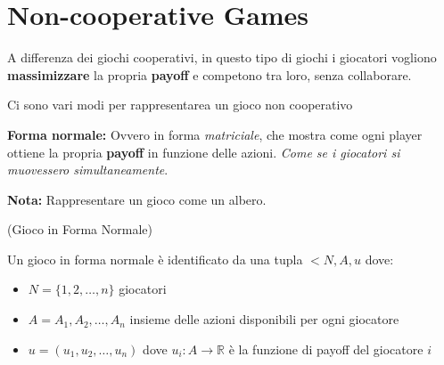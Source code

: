 \section{Non-cooperative Games}
A differenza dei giochi cooperativi, in questo tipo di giochi i giocatori
vogliono \textbf{massimizzare} la propria \textbf{payoff} e competono tra loro,
senza collaborare.

Ci sono vari modi per rappresentarea un gioco non cooperativo

\textbf{Forma normale:} Ovvero in forma \textit{matriciale}, che mostra come ogni player ottiene la propria \textbf{payoff} in funzione delle azioni. \textit{Come se i giocatori si muovessero simultaneamente}.

\textbf{Nota:} Rappresentare un gioco come un albero.

\begin{figure}[H]
    \begin{center}
    \end{center}
\end{figure}

\begin{definition}(Gioco in Forma Normale)
\end{definition}

Un gioco in forma normale è identificato da una tupla $<N,A,u$ dove:
\begin{itemize}
    \item $N = \{1,2,\dots,n\}$ giocatori
    \item $A = {A_1, A_2, \dots, A_n}$ insieme delle azioni disponibili per ogni giocatore
    \item $u = (u_1, u_2, \dots, u_n)$ dove $u_i: A \rightarrow \mathbb{R}$ è la funzione di payoff del giocatore $i$
\end{itemize}

